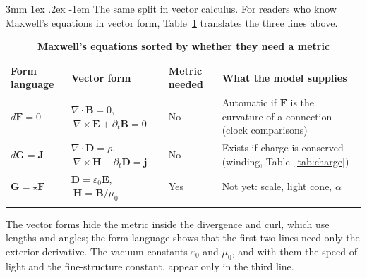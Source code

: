 \documentclass[%
 reprint, amsmath,amssymb, aps, prb, ]{revtex4-2}
\makeatletter
\numberwithin{equation}{section}
\renewcommand\paragraph{%
  \@startsection{paragraph}{4}{\z@}%
    {3mm \@plus 1ex \@minus .2ex}%
    {-1em}%
    {\normalfont\normalsize\itshape}}
\newcommand{\FF}{\mathbf{F}}
\newcommand{\hodge}{\star}
\makeatother
\begin{document}
\paragraph{The same split in vector calculus.} For readers who know Maxwell's equations in vector form, Table~\ref{tab:maxwell} translates the three lines above.

\begin{table}[t!]
\centering
\caption{\textbf{Maxwell's equations sorted by whether they need a metric}}
\label{tab:maxwell}
\renewcommand{\arraystretch}{1.4}
\begin{tabular}{p{3.0cm}p{4.6cm}p{3.6cm}p{4.3cm}}
\toprule
\textbf{Form language} & \textbf{Vector form} & \textbf{Metric needed} & \textbf{What the model supplies} \\
\midrule
$d\FF=0$
& $\nabla\cdot\mathbf{B}=0$, $\ \nabla\times\mathbf{E}+\partial_t\mathbf{B}=0$
& No
& Automatic if $\FF$ is the curvature of a connection (clock comparisons) \\
\addlinespace[0.3cm]
$d\mathbf{G}=\mathbf{J}$
& $\nabla\cdot\mathbf{D}=\rho$, $\ \nabla\times\mathbf{H}-\partial_t\mathbf{D}=\mathbf{j}$
& No
& Exists if charge is conserved (winding, Table~\ref{tab:charge}) \\
\addlinespace[0.3cm]
$\mathbf{G}=\hodge\FF$
& $\mathbf{D}=\varepsilon_0\mathbf{E}$, $\ \mathbf{H}=\mathbf{B}/\mu_0$
& Yes
& Not yet: scale, light cone, $\alpha$ \\
\addlinespace[0.2cm]
\bottomrule
\end{tabular}
\vspace{0.2cm}
\begin{minipage}{0.95\textwidth}
\justifying\footnotesize
The vector forms hide the metric inside the divergence and curl, which use lengths and angles; the form language shows that the first two lines need only the exterior derivative. The vacuum constants $\varepsilon_0$ and $\mu_0$, and with them the speed of light and the fine-structure constant, appear only in the third line.
\end{minipage}
\end{table}
\end{document}
